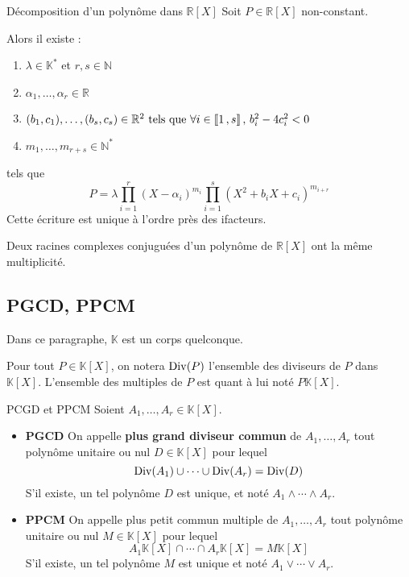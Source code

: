     \begin{coro}{Décomposition d’un polynôme dans $\mathbb{R}[X]$}{}
        Soit $P \in \mathbb{R}[X]$ non-constant.
    
        Alors il existe : 
            \begin{enumerate}
                \item $\lambda \in \mathbb{K}^*$ et $r,s \in \mathbb{N}$
                \item $\alpha_1, \ldots, \alpha_r \in \mathbb{R}$
                \item $(b_1,c_1), \ldots, (b_s,c_s) \in \mathbb{R}^2 \text{ tels que } \forall i \in \left\llbracket 1 \, , s \right\rrbracket, \, b_i^2-4c_i^2 < 0$
                \item $m_1,\ldots,m_{r+s} \in \mathbb{N}^*$
            \end{enumerate}    
        tels que \[ P = \lambda \prod\limits_{i=1}^{r} (X- \alpha_i)^{m_i} \prod\limits_{i=1}^s (X^2 + b_iX + c_i)^{m_{i+r}} \] 
        Cette écriture est unique à l’ordre près des ifacteurs.
    \end{coro}

    \begin{coro}{}{}
        Deux racines complexes conjuguées d’un polynôme de $\mathbb{R}[X]$ ont la même multiplicité.
    \end{coro}

\subsection{PGCD, PPCM}

    Dans ce paragraphe, $\mathbb{K}$ est un corps quelconque.

    Pour tout $P \in \mathbb{K}[X]$, on notera $\operatorname{Div}(P)$ l’ensemble des diviseurs de $P$ dans $\mathbb{K}[X]$. L’ensemble des multiples de $P$ est quant à lui noté $P \mathbb{K}[X]$.

    \begin{defi}{PCGD et PPCM}{}
        Soient $A_1, \ldots, A_r \in \mathbb{K}[X]$.
        \begin{itemize}[label=\textcolor{myyellow}{$\star$}]
            \item \textbf{PGCD} \quad On appelle \textbf{plus grand diviseur commun} de $A_1, \ldots,A_r$ tout polynôme unitaire ou nul $D \in \mathbb{K}[X]$ pour lequel 
            \[ \operatorname{Div}(A_1) \cup \cdots \cup \operatorname{Div}(A_r) = \operatorname{Div}(D) \]   
            S’il existe, un tel polynôme $D$ est unique, et noté $A_1 \wedge \cdots \wedge A_r$.
            \item \textbf{PPCM} \quad On appelle plus petit commun multiple de $A_1, \ldots, A_r$ tout polynôme unitaire ou nul $M \in \mathbb{K}[X]$ pour lequel 
            \[ A_1 \mathbb{K}[X] \cap \cdots \cap A_r \mathbb{K}[X] = M \mathbb{K}[X] \]
            S’il existe, un tel polynôme $M$ est unique et noté $A_1 \vee \cdots \vee A_r$.
        \end{itemize}
    \end{defi}

